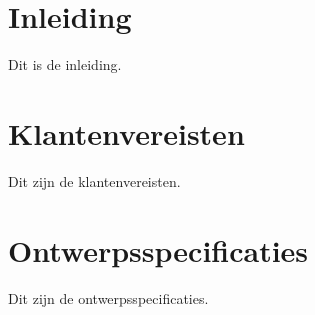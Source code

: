 \documentclass{article}
\begin{document}
\section{Inleiding}

Dit is de inleiding.

\section{Klantenvereisten}

Dit zijn de klantenvereisten.

\section{Ontwerpsspecificaties}

Dit zijn de ontwerpsspecificaties.
\end{document}
